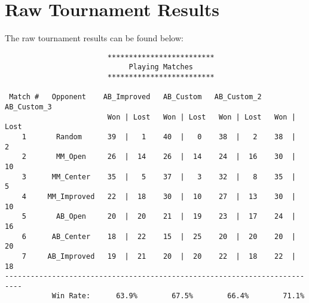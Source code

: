 \documentclass{article}
\begin{document}
\section{Raw Tournament Results}
The raw tournament results can be found below:
\begin{verbatim}
                        *************************                         
                             Playing Matches                              
                        *************************                         

 Match #   Opponent    AB_Improved   AB_Custom   AB_Custom_2  AB_Custom_3 
                        Won | Lost   Won | Lost   Won | Lost   Won | Lost 
    1       Random      39  |   1    40  |   0    38  |   2    38  |   2  
    2       MM_Open     26  |  14    26  |  14    24  |  16    30  |  10  
    3      MM_Center    35  |   5    37  |   3    32  |   8    35  |   5  
    4     MM_Improved   22  |  18    30  |  10    27  |  13    30  |  10  
    5       AB_Open     20  |  20    21  |  19    23  |  17    24  |  16  
    6      AB_Center    18  |  22    15  |  25    20  |  20    20  |  20  
    7     AB_Improved   19  |  21    20  |  20    22  |  18    22  |  18  
--------------------------------------------------------------------------
           Win Rate:      63.9%        67.5%        66.4%        71.1%  
\end{verbatim}
\end{document}
